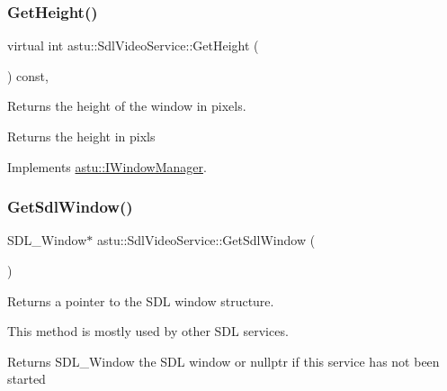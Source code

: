 \subsubsection{\texorpdfstring{Get\+Height()}{GetHeight()}}
{\footnotesize\ttfamily virtual int astu\+::\+Sdl\+Video\+Service\+::\+Get\+Height (\begin{DoxyParamCaption}{ }\end{DoxyParamCaption}) const\hspace{0.3cm}{\ttfamily [override]}, {\ttfamily [virtual]}}

Returns the height of the window in pixels.

\begin{DoxyReturn}{Returns}
the height in pixls 
\end{DoxyReturn}


Implements \hyperlink{classastu_1_1IWindowManager_a80a146779e21437e8c6ef78889389dfc}{astu\+::\+I\+Window\+Manager}.

\mbox{\label{classastu_1_1SdlVideoService_af0282450cc95c0cbc2a6add84603dd7a}} 
\subsubsection{\texorpdfstring{Get\+Sdl\+Window()}{GetSdlWindow()}}
{\footnotesize\ttfamily S\+D\+L\+\_\+\+Window$\ast$ astu\+::\+Sdl\+Video\+Service\+::\+Get\+Sdl\+Window (\begin{DoxyParamCaption}{ }\end{DoxyParamCaption})}

Returns a pointer to the S\+DL window structure.

This method is mostly used by other S\+DL services.

\begin{DoxyReturn}{Returns}
S\+D\+L\+\_\+\+Window the S\+DL window or {\ttfamily nullptr} if this service has not been started 
\end{DoxyReturn}
\mbox{\label{classastu_1_1SdlVideoService_ad6ee7f7a409960e91ddd77bbcea6432f}} 
